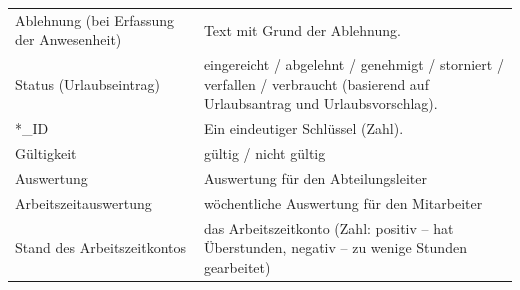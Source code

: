 \begin{tabular}{L{0.3} L{0.7}}
Ablehnung (bei Erfassung der Anwesenheit)					&	Text mit Grund der Ablehnung.				\\
Status (Urlaubseintrag)					&	eingereicht / abgelehnt / genehmigt / storniert / verfallen / verbraucht (basierend auf Urlaubsantrag und Urlaubsvorschlag).				\\
*\_ID					&	Ein eindeutiger Schlüssel (Zahl).				\\
Gültigkeit					&	gültig / nicht gültig				\\
Auswertung					&	Auswertung für den Abteilungsleiter				\\
Arbeitszeitauswertung					&	wöchentliche Auswertung für den Mitarbeiter				\\
Stand des Arbeitszeitkontos					&	das Arbeitszeitkonto (Zahl: positiv -- hat Überstunden, negativ -- zu wenige Stunden gearbeitet)				\\
\end{tabular}

 
